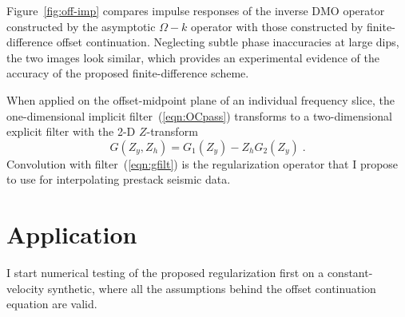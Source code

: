 Figure~\ref{fig:off-imp} compares impulse responses of the inverse DMO
operator constructed by the asymptotic $\Omega-k$ operator with those
constructed by finite-difference offset continuation. Neglecting
subtle phase inaccuracies at large dips, the two images look similar,
which provides an experimental evidence of the accuracy of the
proposed finite-difference scheme.

When applied on the offset-midpoint plane of an individual frequency
slice, the one-dimensional implicit filter~(\ref{eqn:OCpass})
transforms to a two-dimensional explicit filter with the
2-D $Z$-transform 
\begin{equation}
\label{eqn:gfilt}
G(Z_y,Z_h) = G_1(Z_y) - Z_h G_2(Z_y)\;.
\end{equation}
Convolution with filter~(\ref{eqn:gfilt}) is the regularization
operator that I propose to use for interpolating prestack seismic data.

  




\section{Application}
I start numerical testing of the proposed regularization first on a
constant-velocity synthetic, where all the assumptions behind the
offset continuation equation are valid.  
%

